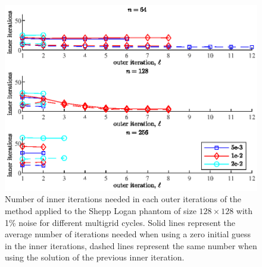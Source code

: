 \begin{figure}[htbp]
\begin{center}
\includegraphics{figures/inner_iteration_zero_initial_guess}
\caption{Number of inner iterations needed in each outer iterations of the method applied to the Shepp Logan phantom of size $128 \times 128$ with 1\% noise for different multigrid cycles. Solid lines represent the average number of iterations needed when using a zero initial guess in the inner iterations, dashed lines represent the same number when using the solution of the previous inner iteration.}
\label{fig:inner_iteration_zero_initial_guess}
\end{center}
\end{figure}

